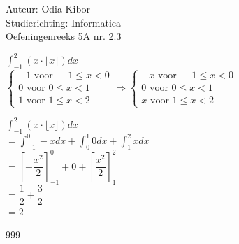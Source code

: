 \documentclass[a4paper]{article}
\begin{document}
  
\noindent \large Auteur: Odia Kibor \\
\noindent \large Studierichting: Informatica\\
\noindent \large Oefeningenreeks 5A nr. 2.3
\\

\medskip

\normalsize


$\displaystyle\int_{-1}^{2} (x \cdot \lfloor x \rfloor) dx  $\\

$\left \{
\begin{array}{l} 
-1 \text{ voor } -1 \le x < 0 \\
0 \text{ voor } 0 \le x < 1 \\
1 \text{ voor } 1 \le x < 2
\end{array}
\right .
\Rightarrow
\left \{
\begin{array}{l} 
-x \text{ voor } -1 \le x < 0 \\
0 \text{ voor } 0 \le x < 1 \\
x \text{ voor } 1 \le x < 2
\end{array}
\right .$

$\displaystyle\int_{-1}^{2} (x \cdot \lfloor x \rfloor) dx  $\\

$=\displaystyle\int_{-1}^{0} -x dx + \displaystyle\int_{0}^{1} 0 dx + \displaystyle\int_{1}^{2} x dx$\\

$= \left[-\dfrac{x^2}{2} \right]_{-1}^{0} + 0 + \left[\dfrac{x^2}{2} \right]_{1}^{2}$\\

$= \dfrac{1}{2} + \dfrac{3}{2}$\\

$= 2$


















\begin{thebibliography}{999}
\end{thebibliography}
\end{document}
